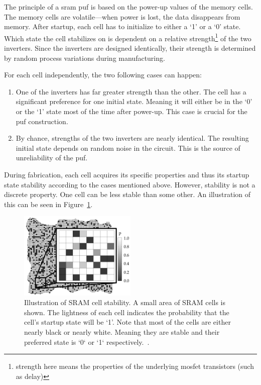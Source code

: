 The principle of a \gls{sram} \gls{puf} is based on the power-up values of the memory cells. The memory cells are volatile---when power is lost, the data disappears from memory. After startup, each cell has to initialize to either a `1' or a `0' state. Which state the cell stabilizes on is dependent on a relative strength\footnote{strength here means the properties of the underlying \gls{mosfet} transistors (such as delay)} of the two inverters. Since the inverters are designed identically, their strength is determined by random process variations during manufacturing.\cite{Maes2010}

For each cell independently, the two following cases can happen:

\begin{enumerate}
    \item One of the inverters has far greater strength than the other. The cell has a significant preference for one initial state. Meaning it will either be in the `0' or the `1' state most of the time after power-up. This case is crucial for the \gls{puf} construction.
    \item By chance, strengths of the two inverters are nearly identical. The resulting initial state depends on random noise in the circuit. This is the source of unreliability of the \gls{puf}.
\end{enumerate}

During fabrication, each cell acquires its specific properties and thus its startup state stability according to the cases mentioned above. However, stability is not a discrete property. One cell can be less stable than some other. An illustration of this can be seen in Figure~\ref{fig:sram_puf_stability}.

\begin{figure}[ht!]
    \centering
    \captionsetup{justification=justified,margin=0.5cm}
    \includegraphics[width=0.5\textwidth]{images/sram_puf_stability.jpg}
    \caption[Illustration of SRAM cell stability.]{Illustration of SRAM cell stability. A small area of SRAM cells is shown. The lightness of each cell indicates the probability that the cell's startup state will be `1'. Note that most of the cells are either nearly black or nearly white. Meaning they are stable and their preferred state is `0` or `1` respectively.~\cite{Holcomb2009}.}
    \label{fig:sram_puf_stability}
\end{figure}

